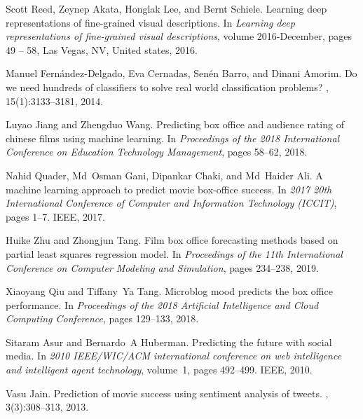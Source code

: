 \documentclass[review]{cvpr}
\begin{document}
{\small

%
\begin{thebibliography}{10}


Scott Reed, Zeynep Akata, Honglak Lee, and Bernt Schiele.
\newblock Learning deep representations of fine-grained visual descriptions.
\newblock In {\em Learning deep representations of fine-grained visual
  descriptions}, volume 2016-December, pages 49 -- 58, Las Vegas, NV, United
  states, 2016.


Manuel Fern{\'a}ndez-Delgado, Eva Cernadas, Sen{\'e}n Barro, and Dinani Amorim.
\newblock Do we need hundreds of classifiers to solve real world classification
  problems?
, 15(1):3133--3181,
  2014.


Luyao Jiang and Zhengduo Wang.
\newblock Predicting box office and audience rating of chinese films using
  machine learning.
\newblock In {\em Proceedings of the 2018 International Conference on Education
  Technology Management}, pages 58--62, 2018.


Nahid Quader, Md~Osman Gani, Dipankar Chaki, and Md~Haider Ali.
\newblock A machine learning approach to predict movie box-office success.
\newblock In {\em 2017 20th International Conference of Computer and
  Information Technology (ICCIT)}, pages 1--7. IEEE, 2017.


Huike Zhu and Zhongjun Tang.
\newblock Film box office forecasting methods based on partial least squares
  regression model.
\newblock In {\em Proceedings of the 11th International Conference on Computer
  Modeling and Simulation}, pages 234--238, 2019.



Xiaoyang Qiu and Tiffany~Ya Tang.
\newblock Microblog mood predicts the box office performance.
\newblock In {\em Proceedings of the 2018 Artificial Intelligence and Cloud
  Computing Conference}, pages 129--133, 2018.



Sitaram Asur and Bernardo~A Huberman.
\newblock Predicting the future with social media.
\newblock In {\em 2010 IEEE/WIC/ACM international conference on web
  intelligence and intelligent agent technology}, volume~1, pages 492--499.
  IEEE, 2010.


Vasu Jain.
\newblock Prediction of movie success using sentiment analysis of tweets.
, 3(3):308--313, 2013.



\end{thebibliography}}
\end{document}

